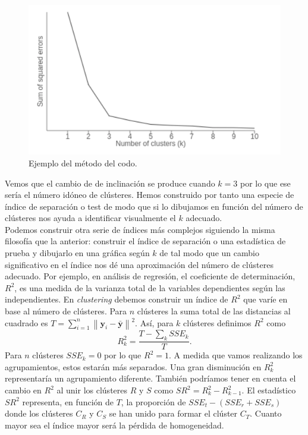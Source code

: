 \documentclass[a4paper, 20pt]{article}
\newcommand{\norm}[1]{\left\lVert#1\right\rVert}
\newcommand{\yy}{\textbf{y}}
\begin{document}
\begin{figure}[h]
	\centering
	\includegraphics[scale=0.6]{pedro/elbowGraph}
	\caption{Ejemplo del método del codo.}
	\label{fig:elbow}
\end{figure}

Vemos que el cambio de de inclinación se produce cuando $ k=3 $ por lo que ese sería el número idóneo de clústeres. Hemos construido por tanto una especie de índice de separación o test de modo que si lo dibujamos en función del número de clústeres nos ayuda a identificar visualmente el $ k $ adecuado. \\

Podemos construir otra serie de índices más complejos siguiendo la misma filosofía que la anterior: construir el índice de separación o una estadística de prueba y dibujarlo en una gráfica según $ k $ de tal modo que un cambio significativo en el índice nos dé una aproximación del número de clústeres adecuado. Por ejemplo, en análisis de regresión, el coeficiente de determinación, $ R^2 $, es una medida de la varianza total de la variables dependientes según las independientes. En \textit{clustering} debemos construir un índice de $ R^2 $ que varíe en base al número de clústeres. Para $ n $ clústeres la suma total de las distancias al cuadrado es $ T = \sum_{i = 1}^{n} \norm{\yy_i - \bar{\yy}}^2 $. Así, para $ k $ clústeres definimos $ R^2 $ como
\[
R^{2}_{k} = \frac{T - \sum_k SSE_k}{T}.
\]
Para $ n $ clústeres $ SSE_k = 0 $ por lo que $ R^2 = 1 $. A medida que vamos realizando los agrupamientos, estos estarán más separados. Una gran disminución en $ R^2_k $ representaría un agrupamiento diferente. También podríamos tener en cuenta el cambio en $ R^2 $ al unir los clústeres $ R $ y $ S $ como $ SR^2 = R_k^2 - R^2_{k-1} $. El estadístico $ SR^2 $ representa, en función de $ T $, la proporción de $ SSE_t - (SSE_r + SSE_s) $ donde los clústeres $ C_R $ y $ C_S $ se han unido para formar el clúster $ C_T $.  Cuanto mayor sea el índice mayor será la pérdida de homogeneidad.\\
\end{document}
